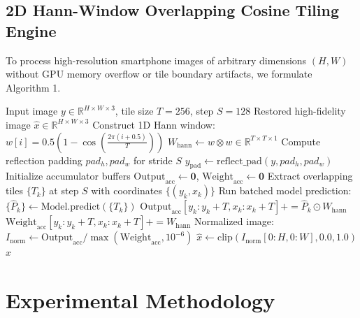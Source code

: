 \documentclass{ieeeaccess}
\begin{document}
\subsection{2D Hann-Window Overlapping Cosine Tiling Engine}
To process high-resolution smartphone images of arbitrary dimensions $(H, W)$ without GPU memory overflow or tile boundary artifacts, we formulate Algorithm 1.

\begin{algorithm}[htbp]
\caption{2D Hann-Window Overlapping Cosine Tiling Inference}
\label{alg:tiling}
\begin{algorithmic}[1]
\REQUIRE Input image $y \in \mathbb{R}^{H \times W \times 3}$, tile size $T = 256$, step $S = 128$
\ENSURE Restored high-fidelity image $\hat{x} \in \mathbb{R}^{H \times W \times 3}$
\STATE Construct 1D Hann window: $w[i] = 0.5 \left(1 - \cos\left(\frac{2\pi (i + 0.5)}{T}\right)\right)$
\STATE $W_{\text{hann}} \leftarrow w \otimes w \in \mathbb{R}^{T \times T \times 1}$
\STATE Compute reflection padding $pad_h, pad_w$ for stride $S$
\STATE $y_{\text{pad}} \leftarrow \text{reflect\_pad}(y, pad_h, pad_w)$
\STATE Initialize accumulator buffers $\text{Output}_{\text{acc}} \leftarrow \mathbf{0}$, $\text{Weight}_{\text{acc}} \leftarrow \mathbf{0}$
\STATE Extract overlapping tiles $\{T_k\}$ at step $S$ with coordinates $\{(y_k, x_k)\}$
\STATE Run batched model prediction: $\{\hat{P}_k\} \leftarrow \text{Model.predict}(\{T_k\})$
    \STATE $\text{Output}_{\text{acc}}[y_k:y_k+T, x_k:x_k+T] += \hat{P}_k \odot W_{\text{hann}}$
    \STATE $\text{Weight}_{\text{acc}}[y_k:y_k+T, x_k:x_k+T] += W_{\text{hann}}$
\ENDFOR
\STATE Normalized image: $I_{\text{norm}} \leftarrow \text{Output}_{\text{acc}} / \max(\text{Weight}_{\text{acc}}, 10^{-6})$
\STATE $\hat{x} \leftarrow \text{clip}(I_{\text{norm}}[0:H, 0:W], 0.0, 1.0)$
\RETURN $\hat{x}$
\end{algorithmic}
\end{algorithm}

\section{Experimental Methodology}
\label{sec:methodology}
\end{document}
